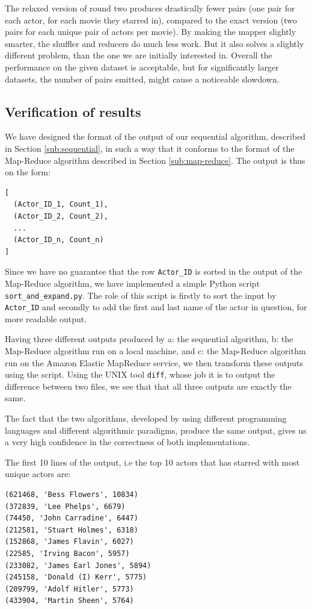 \documentclass[a4paper,11pt]{article}
\begin{document}
The relaxed version of round two produces drastically fewer pairs (one pair for each actor, for each movie they starred in), compared to the exact version (two pairs for each unique pair of actors per movie). By making the mapper slightly smarter, the shuffler and reducers do much less work. But it also solves a slightly different problem, than the one we are initially interested in. Overall the performance on the given dataset is acceptable, but for significantly larger datasets, the number of pairs emitted, might cause a noticeable slowdown. 


\subsection{Verification of results}
\label{sub:verification}
We have designed the format of the output of our sequential algorithm, described in Section \ref{sub:sequential}, in such a way that it conforms to the format of the Map-Reduce algorithm described in Section \ref{sub:map-reduce}. 
The output is thus on the form:
\begin{verbatim}
[ 
  (Actor_ID_1, Count_1),
  (Actor_ID_2, Count_2),
  ...
  (Actor_ID_n, Count_n)
]
\end{verbatim}
Since we have no guarantee that the row \texttt{Actor\_ID} is sorted in the output of the Map-Reduce algorithm, we have implemented a simple Python script \texttt{sort\_and\_expand.py}. 
The role of this script is firstly to sort the input by \texttt{Actor\_ID} and secondly to add the first and last name of the actor in question, for more readable output.

Having three different outputs produced by a: the sequential algorithm, b: the Map-Reduce algorithm run on a local machine, and c: the Map-Reduce algorithm run on the Amazon Elastic MapReduce service, we then transform these outputs using the script.
Using the UNIX tool \texttt{diff}, whose job it is to output the difference between two files, we see that that all three outputs are exactly the same.

The fact that the two algorithms, developed by using different programming languages and different algorithmic paradigms, produce the same output, gives us a very high confidence in the correctness of both implementations.

The first 10 lines of the output, i.e the top 10 actors that has starred with most unique actors are: 
\begin{verbatim}
(621468, 'Bess Flowers', 10834)
(372839, 'Lee Phelps', 6679)
(74450, 'John Carradine', 6447)
(212581, 'Stuart Holmes', 6318)
(152868, 'James Flavin', 6027)
(22585, 'Irving Bacon', 5957)
(233082, 'James Earl Jones', 5894)
(245158, 'Donald (I) Kerr', 5775)
(209799, 'Adolf Hitler', 5773)
(433904, 'Martin Sheen', 5764)
\end{verbatim}
\end{document}
